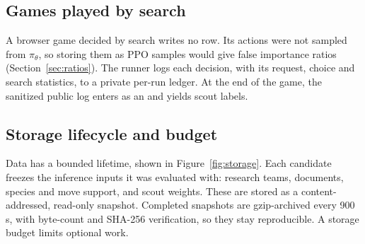 \subsection{Games played by search}
A browser game decided by search writes no  row. Its actions
were not sampled from $\pi_\theta$, so storing them as PPO samples would give
false importance ratios (Section~\ref{sec:ratios}). The runner logs each
decision, with its request, choice and search statistics, to a private
per-run ledger. At the end of the game, the sanitized public log enters
 as an  and yields scout labels.

\subsection{Storage lifecycle and budget}
Data has a bounded lifetime, shown in Figure~\ref{fig:storage}. Each candidate
freezes the inference inputs it was evaluated with: research teams, documents,
species and move support, and scout weights. These are stored as a
content-addressed, read-only snapshot. Completed snapshots are gzip-archived
every 900\,s, with byte-count and SHA-256 verification, so they stay
reproducible. A storage budget limits optional work.

